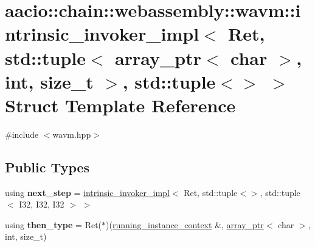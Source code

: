 \hypertarget{structaacio_1_1chain_1_1webassembly_1_1wavm_1_1intrinsic__invoker__impl_3_01_ret_00_01std_1_1tup96c14ddb984aab19f252a13225bc9a1f}{}\section{aacio\+:\+:chain\+:\+:webassembly\+:\+:wavm\+:\+:intrinsic\+\_\+invoker\+\_\+impl$<$ Ret, std\+:\+:tuple$<$ array\+\_\+ptr$<$ char $>$, int, size\+\_\+t $>$, std\+:\+:tuple$<$$>$ $>$ Struct Template Reference}
\label{structaacio_1_1chain_1_1webassembly_1_1wavm_1_1intrinsic__invoker__impl_3_01_ret_00_01std_1_1tup96c14ddb984aab19f252a13225bc9a1f}


{\ttfamily \#include $<$wavm.\+hpp$>$}

\subsection*{Public Types}
\begin{DoxyCompactItemize}
\item 
\mbox{\label{structaacio_1_1chain_1_1webassembly_1_1wavm_1_1intrinsic__invoker__impl_3_01_ret_00_01std_1_1tup96c14ddb984aab19f252a13225bc9a1f_ae4431d280fa9b4d3c76e98e4905b239d}} 
using {\bfseries next\+\_\+step} = \mbox{\hyperlink{structaacio_1_1chain_1_1webassembly_1_1wavm_1_1intrinsic__invoker__impl}{intrinsic\+\_\+invoker\+\_\+impl}}$<$ Ret, std\+::tuple$<$$>$, std\+::tuple$<$ I32, I32, I32 $>$ $>$
\item 
\mbox{\label{structaacio_1_1chain_1_1webassembly_1_1wavm_1_1intrinsic__invoker__impl_3_01_ret_00_01std_1_1tup96c14ddb984aab19f252a13225bc9a1f_a1807385bab2bb5ba54118414b9bb8ca1}} 
using {\bfseries then\+\_\+type} = Ret($\ast$)(\mbox{\hyperlink{structaacio_1_1chain_1_1webassembly_1_1wavm_1_1running__instance__context}{running\+\_\+instance\+\_\+context}} \&, \mbox{\hyperlink{structaacio_1_1chain_1_1array__ptr}{array\+\_\+ptr}}$<$ char $>$, int, size\+\_\+t)
\end{DoxyCompactItemize}
